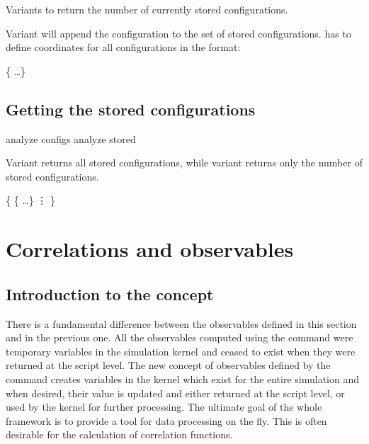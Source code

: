 Variants  to  return the number of currently
stored configurations.

Variant  will append the configuration  to the
set of stored configurations.  has to define coordinates
for all configurations in the format:
\begin{code}
 \{      \dots \}
\end{code}

\subsection{Getting the stored configurations}
\label{analyze:configs}
\label{analyze:stored}
\begin{essyntax}
   analyze configs
   analyze stored 
\end{essyntax}

Variant  returns all stored configurations, while variant
 returns only the number of stored configurations.

\begin{code}
\{
  \{      \dots \}
  \vdots
\}
\end{code}
\section{Correlations and observables}

\subsection{Introduction to the concept}
There is a fundamental difference between the observables defined in this
section and in the previous one. All the observables computed using the
 command were temporary variables in the simulation kernel
and ceased to exist when they were returned at the script level.
The new concept of observables defined by the  command
creates variables in the kernel which exist for the entire simulation 
and when desired, their value is updated and either returned at the 
script level, or used by the kernel for further processing.
The ultimate goal of the whole framework is to provide a tool for
data processing on the fly. This is often desirable for 
the calculation of correlation functions. 

